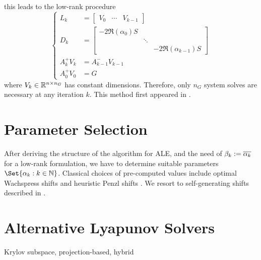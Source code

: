 this leads to the low-rank procedure
\begin{equation}
\label{eq:adi:si-lr-adi}
\left\{
\begin{aligned}
  L_k &= \begin{bmatrix}
    V_0 &
    \cdots &
    V_{k-1}
  \end{bmatrix} \\
  D_k &= \begin{bmatrix}
    -2 \Re(\alpha_0) S \\
    & \ddots \\
    && -2 \Re(\alpha_{k-1}) S
  \end{bmatrix} \\
  A_k^+ V_k &= A_{k-1}^- V_{k-1} \\
  A_0^+ V_0 &= G
\end{aligned}
\right.
\end{equation}
where $V_k \in\mathbb{R}^{n\times n_G}$ has constant dimensions.
Therefore, only $n_G$ system solves are necessary at any iteration $k$.
This method first appeared in \cite[Section~5]{Benner2009}.




\section{Parameter Selection}
\label{sec:adi:parameters}

After deriving the structure of the algorithm for \ac{ALE},
and the need of $\beta_k := \conj{\alpha_k}$ for a low-rank formulation,
we have to determine suitable parameters $\Set{\alpha_k : k\in\N}$.
Classical choices of pre-computed values include
optimal Wachspress shifts \cite{Wachspress1992,Wachspress2013} and
heuristic Penzl shifts \cite{Penzl1999}.
We resort to self-generating shifts described in \cite[Section~5.3]{Kuerschner2016}.

\section{Alternative Lyapunov Solvers}
Krylov subspace,
projection-based,
hybrid

